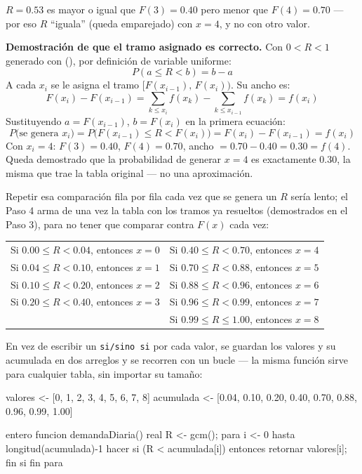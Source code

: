 \documentclass[12pt]{article}
\begin{document}
\begin{description}
    $R=0.53$ es mayor o igual que $F(3)=0.40$ pero menor que $F(4)=0.70$ — por eso $R$ ``iguala'' (queda emparejado) con $x=4$, y no con otro valor.

    \textbf{Demostración de que el tramo asignado es correcto.} Con $0 < R < 1$ generado con (), por definición de variable uniforme:
    \[
    P(a \leq R < b) = b-a
    \]
    A cada $x_i$ se le asigna el tramo $\big[F(x_{i-1}),\,F(x_i)\big)$. Su ancho es:
    \[
    F(x_i)-F(x_{i-1}) = \sum_{k \leq x_i} f(x_k) - \sum_{k \leq x_{i-1}} f(x_k) = f(x_i)
    \]
    Sustituyendo $a=F(x_{i-1})$, $b=F(x_i)$ en la primera ecuación:
    \[
    P\big(\text{se genera } x_i\big) = P\big(F(x_{i-1}) \leq R < F(x_i)\big) = F(x_i)-F(x_{i-1}) = f(x_i)
    \]
    Con $x_i=4$: $F(3)=0.40$, $F(4)=0.70$, ancho $=0.70-0.40=0.30=f(4)$. Queda demostrado que la probabilidad de generar $x=4$ es exactamente $0.30$, la misma que trae la tabla original — no una aproximación.

    \item[Paso 4: Aplicar la función inversa $x=F^{-1}(R)$]

    Repetir esa comparación fila por fila cada vez que se genera un $R$ sería lento; el Paso 4 arma de una vez la tabla con los tramos ya resueltos (demostrados en el Paso 3), para no tener que comparar contra $F(x)$ cada vez:

    \begin{center}
    \begin{tabular}{ll}
    Si $0.00 \leq R < 0.04$, entonces $x=0$ & Si $0.40 \leq R < 0.70$, entonces $x=4$ \\
    Si $0.04 \leq R < 0.10$, entonces $x=1$ & Si $0.70 \leq R < 0.88$, entonces $x=5$ \\
    Si $0.10 \leq R < 0.20$, entonces $x=2$ & Si $0.88 \leq R < 0.96$, entonces $x=6$ \\
    Si $0.20 \leq R < 0.40$, entonces $x=3$ & Si $0.96 \leq R < 0.99$, entonces $x=7$ \\
                                            & Si $0.99 \leq R \leq 1.00$, entonces $x=8$ \\
    \end{tabular}
    \end{center}

    \item[Paso 5: Propuesta algorítmica para la variable aleatoria]

    En vez de escribir un \texttt{si/sino si} por cada valor, se guardan los valores y su acumulada en dos arreglos y se recorren con un bucle — la misma función sirve para cualquier tabla, sin importar su tamaño:

    \begin{Algoritmo}{}
valores   <- [0, 1, 2, 3, 4, 5, 6, 7, 8]
acumulada <- [0.04, 0.10, 0.20, 0.40, 0.70, 0.88, 0.96, 0.99, 1.00]

entero funcion demandaDiaria(){
    real R <- gcm();
    para i <- 0 hasta longitud(acumulada)-1 hacer
        si (R < acumulada[i]) entonces
            retornar valores[i];
        fin si
    fin para
}
    \end{Algoritmo}
\end{description}
\end{document}
